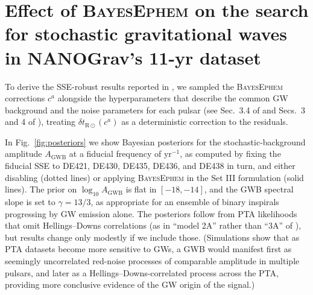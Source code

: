 \documentclass[iop,apj,twocolappendix]{emulateapj}
\begin{document}
\newpage 
\section{Effect of \textsc{BayesEphem} on the search for stochastic gravitational waves in NANOGrav's 11-yr dataset}
\label{sec:results}

To derive the SSE-robust results reported in \cite{2018ApJ...859...47A}, we sampled the \textsc{BayesEphem} corrections $c^a$ alongside the hyperparameters that describe the common GW background and the noise parameters for each pulsar (see Sec.\ 3.4 of \citealt{2018ApJ...859...47A} and Secs.\ 3 and 4 of \citealt{2016ApJ...821...13A}), treating $\delta t_{\mathrm{R}\odot}(c^a)$ as a deterministic correction to the residuals.

In Fig.\ \ref{fig:posteriors} we show Bayesian posteriors for the stochastic-background amplitude $A_\mathrm{GWB}$ at a fiducial frequency of yr$^{-1}$, as computed by fixing the fiducial SSE to DE421, DE430, DE435, DE436, and DE438 in turn, and either disabling (dotted lines) or applying \textsc{BayesEphem} in the Set III formulation (solid lines). The prior on $\log_{10} A_\mathrm{GWB}$ is flat in $[-18,-14]$, and the GWB spectral slope is set to $\gamma = 13/3$, as appropriate for an ensemble of binary inspirals progressing by GW emission alone. The posteriors follow from PTA likelihoods that omit Hellings--Downs correlations (as in ``model 2A'' rather than ``3A'' of \citealt{2018ApJ...859...47A}), but results change only modestly if we include those.
(Simulations show that as PTA datasets become more sensitive to GWs, a GWB would manifest first as seemingly uncorrelated red-noise processes of comparable amplitude in multiple pulsars, and later as a Hellings--Downs-correlated process across the PTA, providing more conclusive evidence of the GW origin of the signal.)
\end{document}
